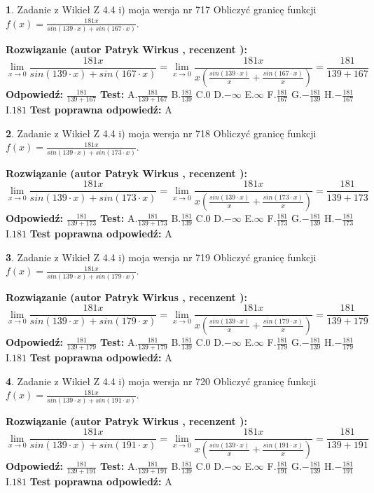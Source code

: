 \documentclass[12pt, a4paper]{article}
\theoremstyle{definition} %
\newtheorem{zad}{}
\newcommand{\zadStart}[1]{\begin{zad}#1\newline}
\newcommand{\zadStop}{\end{zad}}
\newcommand{\rozwStart}[2]{\noindent \textbf{Rozwiązanie (autor #1 , recenzent #2): }\newline}
\newcommand{\rozwStop}{\newline}
\newcommand{\odpStart}{\noindent \textbf{Odpowiedź:}\newline}
\newcommand{\odpStop}{\newline}
\newcommand{\testStart}{\noindent \textbf{Test:}\newline}
\newcommand{\testStop}{\newline}
\newcommand{\kluczStart}{\noindent \textbf{Test poprawna odpowiedź:}\newline}
\newcommand{\kluczStop}{\newline}
\begin{document}
\zadStart{Zadanie z Wikieł Z 4.4 i) moja wersja nr 717}
Obliczyć granicę funkcji $f(x)=\frac{181x}{sin(139\cdot x) +sin(167\cdot x)}$.
\zadStop
\rozwStart{Patryk Wirkus}{}
$$\lim\limits_{x\to 0}\frac{181x}{sin(139\cdot x) +sin(167\cdot x)}=\lim\limits_{x\to 0}\frac{181x}{x(\frac{sin(139\cdot x)}{x}+\frac{sin(167\cdot x)}{x})}=\frac{181}{139+167}$$
\rozwStop
\odpStart
$\frac{181}{139+167}$
\odpStop
\testStart
A.$\frac{181}{139+167}$
B.$\frac{181}{139}$
C.$0$
D.$-\infty$
E.$\infty$
F.$\frac{181}{167}$
G.$-\frac{181}{139}$
H.$-\frac{181}{167}$
I.$181$
\testStop
\kluczStart
A
\kluczStop



\zadStart{Zadanie z Wikieł Z 4.4 i) moja wersja nr 718}
Obliczyć granicę funkcji $f(x)=\frac{181x}{sin(139\cdot x) +sin(173\cdot x)}$.
\zadStop
\rozwStart{Patryk Wirkus}{}
$$\lim\limits_{x\to 0}\frac{181x}{sin(139\cdot x) +sin(173\cdot x)}=\lim\limits_{x\to 0}\frac{181x}{x(\frac{sin(139\cdot x)}{x}+\frac{sin(173\cdot x)}{x})}=\frac{181}{139+173}$$
\rozwStop
\odpStart
$\frac{181}{139+173}$
\odpStop
\testStart
A.$\frac{181}{139+173}$
B.$\frac{181}{139}$
C.$0$
D.$-\infty$
E.$\infty$
F.$\frac{181}{173}$
G.$-\frac{181}{139}$
H.$-\frac{181}{173}$
I.$181$
\testStop
\kluczStart
A
\kluczStop



\zadStart{Zadanie z Wikieł Z 4.4 i) moja wersja nr 719}
Obliczyć granicę funkcji $f(x)=\frac{181x}{sin(139\cdot x) +sin(179\cdot x)}$.
\zadStop
\rozwStart{Patryk Wirkus}{}
$$\lim\limits_{x\to 0}\frac{181x}{sin(139\cdot x) +sin(179\cdot x)}=\lim\limits_{x\to 0}\frac{181x}{x(\frac{sin(139\cdot x)}{x}+\frac{sin(179\cdot x)}{x})}=\frac{181}{139+179}$$
\rozwStop
\odpStart
$\frac{181}{139+179}$
\odpStop
\testStart
A.$\frac{181}{139+179}$
B.$\frac{181}{139}$
C.$0$
D.$-\infty$
E.$\infty$
F.$\frac{181}{179}$
G.$-\frac{181}{139}$
H.$-\frac{181}{179}$
I.$181$
\testStop
\kluczStart
A
\kluczStop



\zadStart{Zadanie z Wikieł Z 4.4 i) moja wersja nr 720}
Obliczyć granicę funkcji $f(x)=\frac{181x}{sin(139\cdot x) +sin(191\cdot x)}$.
\zadStop
\rozwStart{Patryk Wirkus}{}
$$\lim\limits_{x\to 0}\frac{181x}{sin(139\cdot x) +sin(191\cdot x)}=\lim\limits_{x\to 0}\frac{181x}{x(\frac{sin(139\cdot x)}{x}+\frac{sin(191\cdot x)}{x})}=\frac{181}{139+191}$$
\rozwStop
\odpStart
$\frac{181}{139+191}$
\odpStop
\testStart
A.$\frac{181}{139+191}$
B.$\frac{181}{139}$
C.$0$
D.$-\infty$
E.$\infty$
F.$\frac{181}{191}$
G.$-\frac{181}{139}$
H.$-\frac{181}{191}$
I.$181$
\testStop
\kluczStart
A
\kluczStop
\end{document}
